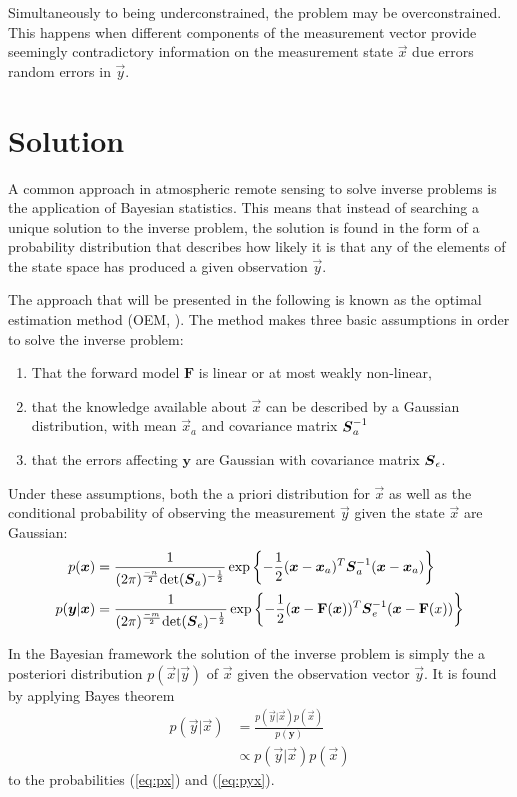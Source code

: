 Simultaneously to being underconstrained, the problem may be overconstrained.
This happens when different components of the measurement vector provide seemingly
contradictory information on the measurement state $\vec{x}$ due errors random
errors in $\vec{y}$.

\section{Solution}

A common approach in atmospheric remote sensing to solve inverse problems is
the application of Bayesian statistics. This means that instead of searching a
unique solution to the inverse problem, the solution is found in the form of a
probability distribution that describes how likely it is that any of the
elements of the state space has produced a given observation $\vec{y}$.

The approach that will be presented in the following is known as the optimal estimation
method (OEM, \textcite{rodgers00}). The method makes three basic assumptions in order
to solve the inverse problem:
\begin{enumerate}
\item That the forward model $\mathbf{F}$ is linear or at most weakly non-linear,
\item that the knowledge available about $\vec{x}$ can be described by a Gaussian distribution,
  with mean $\vec{x}_a$ and covariance matrix $\boldsymbol{S}_a^{-1}$
\item that the errors affecting $\mathbf{y}$ are Gaussian with covariance matrix $\boldsymbol{S}_\epsilon$.
\end{enumerate}

Under these assumptions, both the a priori distribution for  $\vec{x}$ as well as the conditional
probability of observing the measurement $\vec{y}$ given the state $\vec{x}$ are Gaussian:
\begin{align}
p(\boldsymbol{x}) &= \frac{1}{(2 \pi)^{\frac{-n}{2}} \text{det}(\boldsymbol{S}_a)^{-\frac{1}{2}}} \exp \left \{ -\frac{1}{2}(\boldsymbol{x} - \boldsymbol{x}_a)^T\boldsymbol{S}_a^{-1}(\boldsymbol{x} - \boldsymbol{x}_a ) \right \}\label{eq:px}\\
p(\boldsymbol{y} | \boldsymbol{x}) &= \frac{1}{(2 \pi)^{\frac{-m}{2}} \text{det}(\boldsymbol{S}_e)^{-\frac{1}{2}}} \exp \left \{-\frac{1}{2}(\boldsymbol{x} - \mathbf{F}(\boldsymbol{x}))^T\boldsymbol{S}_e^{-1}(\boldsymbol{x} - \mathbf{F}(x)) \right \}\label{eq:pyx}
\end{align}

In the Bayesian framework the solution of the inverse problem is simply the a posteriori distribution
$p(\vec{x} | \vec{y})$ of $\vec{x}$ given the observation vector $\vec{y}$. It is found by applying
Bayes theorem
\begin{align}
  p(\vec{y} | \vec{x}) &= \frac{p(\vec{y} | \vec{x})p(\vec{x})}{p(\mathbf{y})} \\
  &\propto  p(\vec{y} | \vec{x})p(\vec{x})
\end{align}
to the probabilities  (\ref{eq:px}) and (\ref{eq:pyx}).

